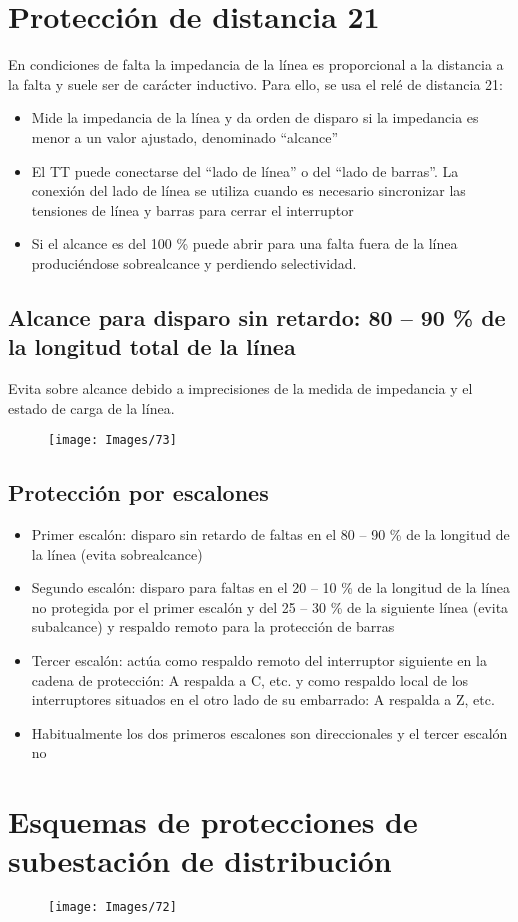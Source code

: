 \section{Protección de distancia 21}
En condiciones de falta la impedancia de la línea es proporcional a la distancia a la falta y suele ser de carácter inductivo. Para ello, se usa el relé de distancia 21:
\begin{itemize}
	\item Mide la impedancia de la línea y da orden de disparo si la impedancia es menor a un valor
	ajustado, denominado “alcance”
	\item El TT puede conectarse del “lado de línea” o del “lado de barras”. La conexión del lado de línea
	se utiliza cuando es necesario sincronizar las tensiones de línea y barras para cerrar el interruptor
	\item Si el alcance es del 100 \% puede abrir para una falta fuera de la línea produciéndose sobrealcance y perdiendo selectividad.
\end{itemize}
\subsection{Alcance para disparo sin retardo: 80 – 90 \% de la longitud total de la línea}
Evita sobre alcance debido a imprecisiones de la medida de impedancia y el estado de carga de la línea.
\begin{figure}[H]
	\centering
	\texttt{[image: Images/73]}
	\label{fig:73}
\end{figure}

\subsection{Protección por escalones}
\begin{itemize}
	\item Primer escalón: disparo sin retardo de faltas en el 80 – 90 \% de la longitud de la línea (evita sobrealcance)
	\item Segundo escalón: disparo para faltas en el 20 – 10 \% de la longitud de la línea no protegida por el primer
	escalón y del 25 – 30 \% de la siguiente línea (evita subalcance) y respaldo remoto para la protección de barras
	\item Tercer escalón: actúa como respaldo remoto del interruptor siguiente en la cadena de protección: A respalda a
	C, etc. y como respaldo local de los interruptores situados en el otro lado de su embarrado: A respalda a Z, etc.
	\item Habitualmente los dos primeros escalones son direccionales y el tercer escalón no
\end{itemize}
\section{Esquemas de protecciones de subestación de distribución}
\begin{figure}[H]
	\centering
	\texttt{[image: Images/72]}
	\label{fig:72}
\end{figure}
